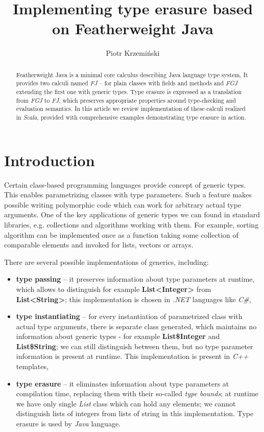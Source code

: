\documentclass{article}[12pt]
\author{Piotr Krzemiński}
\title{Implementing type erasure based on Featherweight Java}
\date{}
\begin{document}
\maketitle


\begin{abstract}
Featherweight Java is a minimal core calculus describing Java language
type system. It provides two calculi named \emph{FJ} -- for plain classes with fields and methods and \emph{FGJ} extending the first
one with generic types. Type erasure is expressed as a translation
from \emph{FGJ} to \emph{FJ}, which preserves appropriate properties
around type-checking and evaluation semantics. In this article
we review implementation of these calculi realized in \emph{Scala}, provided with comprehensive examples demonstrating type erasure in action.
\end{abstract}


\section{Introduction}

Certain class-based programming languages provide concept of generic types. This enables parametrizing classes with type parameters. Such a feature makes possible writing polymorphic code which can work for arbitrary actual type arguments. One of the key applications of generic types we can found in standard libraries, e.g. collections and algorithms working with them. For example, sorting algorithm can be implemented once as a function taking some collection of comparable elements and invoked for lists, vectors or arrays.

There are several possible implementations of generics, including:

\begin{itemize}

\item{\textbf{type passing}} -- it preserves information about type parameters at runtime, which allows to distinguish for example \textbf{List<Integer>} from \textbf{List<String>}; this implementation is chosen in \emph{.NET} languages like \emph{C\#},

\item{\textbf{type instantiating}} -- for every instantiation of parametrized class with actual type arguments, there is separate class generated, which maintains no information about generic types - for example \textbf{List\$Integer} and \textbf{List\$String}; we can still distinguish between them,
but no type parameter information is present at runtime. This implementation is present in \emph{C++} templates,

\item{\textbf{type erasure}} -- it eliminates information about type parameters at compilation time, replacing them with their so-called \emph{type bounds}; at runtime we have only single \emph{List} class which can hold any elements; we cannot distinguish lists of integers from lists of string in this implementation. Type erasure is used by \emph{Java} language.

\end{itemize}
\end{document}
